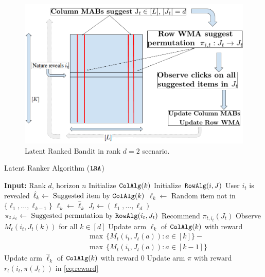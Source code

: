 \begin{figure}
    \includegraphics[scale=0.2]{img/RankedBand.png}
    \caption{Latent Ranked Bandit in rank $d=2$ scenario. }
    \label{fig:rankedbandit}
    \vspace*{-1em}
\end{figure}

\begin{algorithm}[t]
  \caption{Latent Ranker Algorithm (${\tt LRA}$)}
  \label{alg:latent ranker}
  \begin{algorithmic}[1]
    \State \textbf{Input:} Rank $d$, horizon $n$
    \State
      \State Initialize ${\tt ColAlg}(k)$
    \EndFor
      \State Initialize ${\tt RowAlg}(i, J)$
    \EndFor
    \State
      \State User $i_t$ is revealed
        \State $\hat{\ell}_k \gets \text{ Suggested item by } {\tt ColAlg}(k)$
          \State $\ell_k \gets$ Random item not in $\{\ell_1, \dots, \ell_{k - 1}\}$
        \Else
          \State $\ell_k \gets \hat{\ell}_k$
        \EndIf
      \EndFor
      \State $J_t \gets (\ell_1, \dots, \ell_d)$
      \State $\pi_{t, i_t} \gets \text{ Suggested permutation by } {\tt RowAlg}(i_t, J_t)$
      \State
      \State Recommend $\pi_{t, i_t}(J_t)$
      \State Observe $M_t(i_t, J_t(k))$ for all $k \in [d]$
      \State
          \State Update arm $\ell_k$ of ${\tt ColAlg}(k)$ with reward
          \begin{align*}
            \qquad \quad & \max \, \{M_t(i_t, J_t(a)): a \in [k]\} - {} \\
            & \max \, \{M_t(i_t, J_t(a)): a \in [k - 1]\}
          \end{align*}
        \Else
          \State Update arm $\hat{\ell}_k$ of ${\tt ColAlg}(k)$ with reward $0$
        \EndIf
      \EndFor
        \State Update arm $\pi$ with reward $r_t(i_t, \pi(J_t))$ in \eqref{eq:reward}
      \EndFor
    \EndFor
  \end{algorithmic}
\end{algorithm}


